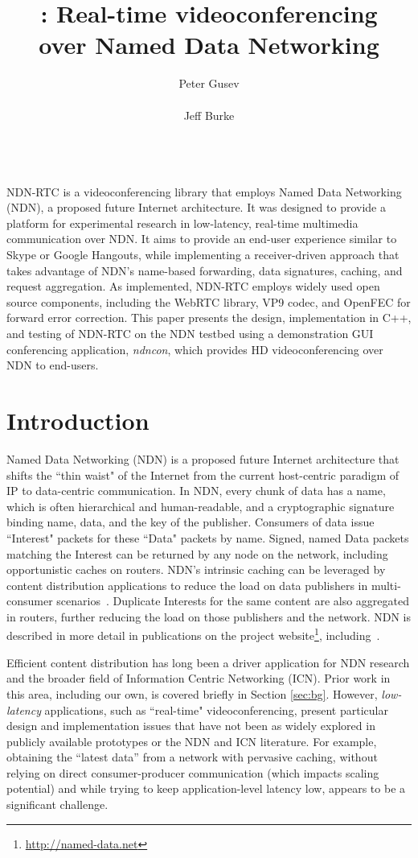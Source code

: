 \documentclass{icn/sig-alternate-2013} %
\title{\ndnrtcName{}: Real-time videoconferencing\\ over Named Data Networking}
\author{
\alignauthor Peter Gusev\\
       \affaddr{UCLA REMAP}\\
       \email{peter@remap.ucla.edu}
\alignauthor Jeff Burke\\
       \affaddr{UCLA REMAP}\\
       \email{jburke@remap.ucla.edu}
}
\newcommand{\ndnrtcName}{NDN-RTC} %
\newcommand{\ndnconName}{\emph{ndncon}}
\begin{document}
\maketitle

\abstract
\ndnrtcName{} is a videoconferencing library that employs Named Data Networking (NDN), a proposed future Internet architecture. It was designed to 
provide a platform for experimental research in low-latency, real-time multimedia communication over NDN. It aims to provide an end-user experience similar to Skype or Google Hangouts, while implementing a receiver-driven approach that takes advantage of NDN's name-based forwarding, data signatures, caching, and request aggregation.  As implemented, \ndnrtcName{} employs widely used open source components, including the WebRTC library, VP9 codec, and OpenFEC for forward error correction. This paper presents the design, implementation in C++, and testing of \ndnrtcName{} on the NDN testbed using a demonstration GUI conferencing application, \ndnconName{}, which provides HD videoconferencing over NDN to end-users. 
\section{Introduction}
Named Data Networking (NDN) is a proposed future Internet architecture that shifts the ``thin waist" of the Internet from the current host-centric paradigm of IP to data-centric communication. In NDN, every chunk of data has a name, which is often hierarchical and human-readable, and a cryptographic signature binding name, data, and the key of the publisher.  Consumers of data issue ``Interest" packets for these ``Data" packets by name. Signed, named Data packets matching the Interest can be returned by any node on the network, including opportunistic caches on routers. NDN's intrinsic caching can be leveraged by content distribution applications to reduce the load on data publishers in multi-consumer scenarios~\cite{ndnvideo}. Duplicate Interests for the same content are also aggregated in routers, further reducing the load on those publishers and the network. NDN is described in more detail in publications on the project website\footnote{\url{http://named-data.net}}, including~\cite{ndntechreport, ndntechreport0, ndn-netw}.

Efficient content distribution has long been a driver application for NDN research and the broader field of Information Centric Networking (ICN). Prior work in this area, including our own, is covered briefly in Section \ref{sec:bg}.  However, \emph{low-latency} applications, such as ``real-time" videoconferencing, present particular design and implementation issues that have not been as widely explored in publicly available prototypes or the NDN and ICN literature. For example, obtaining the ``latest data'' from a network with pervasive caching, without relying on direct consumer-producer communication (which impacts scaling potential) and while trying to keep application-level latency low, appears to be a significant challenge.
\end{document}
